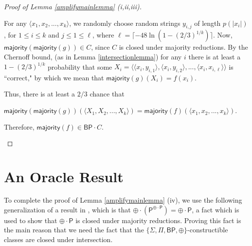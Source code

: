\documentclass[11pt]{article}
\newcommand{\pr}{\text{Pr}}
\newcommand{\bp}{\textsf{BP}}
\newcommand{\parity}{\oplus}
\newcommand{\p}{\textsf{P}}
\newcommand{\majority}{\textsf{majority}}
\begin{document}
\begin{proof}[Proof of Lemma \ref{amplifymainlemma} (i,ii,iii)]
\begin{enumerate}
For any $\langle x_1,x_2,...,x_k\rangle$, we randomly choose random strings $y_{i,j}$ of length $p(|x_i|)$, for $1\le i\le k$ and $j\le 1\le \ell$, where $\ell = \lceil -48\ln(1 - (2/3)^{1/k}) \rceil$.
Now, $\majority(\majority(g)) \in C$, since $C$ is closed under majority reductions. By the Chernoff bound, (as in Lemma \ref{intersectionlemma}) for any $i$ there is at least a $1-(2/3)^{1/k}$ probability that some $X_i = \langle\langle x_i,y_{i,1}\rangle, \langle x_i, y_{i,2}\rangle,...,\langle x_i, x_{i,\ell}\rangle\rangle$ is ``correct," by which we mean that $\majority(g)(X_i) = f(x_i)$.

Thus, there is at least a $2/3$ chance that \begin{center}$\majority(\majority(g))(\langle X_1,X_2,...,X_k\rangle) = \majority(f)(\langle x_1,x_2,...,x_k\rangle)$.\end{center} Therefore, $\majority(f) \in \bp \cdot C$.
\end{enumerate}
\end{proof}

\section{An Oracle Result}\label{oracle}

To complete the proof of Lemma \ref{amplifymainlemma} (iv), we use the following generalization of a result in \cite{Toda}, which is that $\parity \cdot (\p ^{\parity\cdot\p}) = \parity\cdot\p$, a fact which is used to show that $\parity \cdot \p$ is closed under majority reductions. Proving this fact is the main reason that we need the fact that the $\{\Sigma, \Pi, \bp, \parity\}$-constructible classes are closed under intersection.
\end{document}
